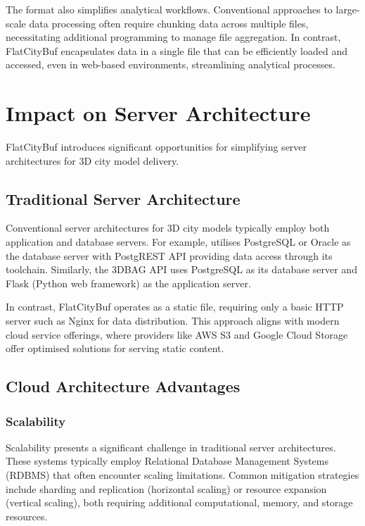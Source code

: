 The format also simplifies analytical workflows. Conventional approaches to large-scale data processing often require chunking data across multiple files, necessitating additional programming to manage file aggregation. In contrast, FlatCityBuf encapsulates data in a single file that can be efficiently loaded and accessed, even in web-based environments, streamlining analytical processes.

\section{Impact on Server Architecture}
\label{affect_on_server_architecture}

FlatCityBuf introduces significant opportunities for simplifying server architectures for 3D city model delivery.

\subsection{Traditional Server Architecture}
\label{traditional_server_architecture}

Conventional server architectures for 3D city models typically employ both application and database servers. For example, \citet{3dcitydb} utilises PostgreSQL or Oracle as the database server with PostgREST API \citep{postgrest} providing data access through its toolchain. Similarly, the 3DBAG API uses PostgreSQL as its database server and Flask (Python web framework) as the application server.

In contrast, FlatCityBuf operates as a static file, requiring only a basic HTTP server such as Nginx \citep{nginx} for data distribution. This approach aligns with modern cloud service offerings, where providers like AWS S3 \citep{s3} and Google Cloud Storage \citep{gsc} offer optimised solutions for serving static content.

\subsection{Cloud Architecture Advantages}
\label{cloud_architecture_achieved}

\subsubsection{Scalability}
\label{scalability}

Scalability presents a significant challenge in traditional server architectures. These systems typically employ Relational Database Management Systems (RDBMS) that often encounter scaling limitations. Common mitigation strategies include sharding and replication (horizontal scaling) or resource expansion (vertical scaling), both requiring additional computational, memory, and storage resources.

